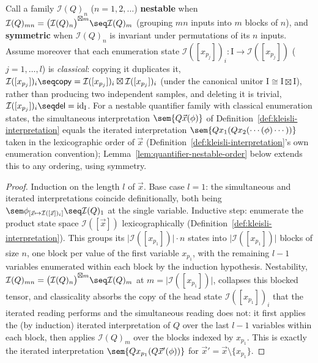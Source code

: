 \begin{lemma}
\label{lem:quantifier-nestable}
\leanok
Call a family $\mathcal I(Q)_n$ ($n = 1,2,\ldots$) \textbf{nestable}
when $\mathcal I(Q)_{mn} = \bigl(\mathcal I(Q)_n\bigr)^{\boxtimes m} \seq
\mathcal I(Q)_m$ (grouping $mn$ inputs into $m$ blocks of $n$), and
\textbf{symmetric} when $\mathcal I(Q)_n$ is invariant under
permutations of its $n$ inputs. Assume moreover that each enumeration
state $\mathcal I([x_{p_j}])_i \colon \mathrm I \to \mathcal
I([x_{p_j}])$ ($j = 1,\ldots,l$) is \emph{classical}: copying it
duplicates it, $\mathcal I([x_{p_j}])_i \seq \mathsf{copy} = \mathcal
I([x_{p_j}])_i \boxtimes \mathcal I([x_{p_j}])_i$ (under the canonical
unitor $\mathrm I \cong \mathrm I \boxtimes \mathrm I$), rather than
producing two independent samples, and deleting it is trivial,
$\mathcal I([x_{p_j}])_i \seq \mathsf{del} = \mathrm{id}_{\mathrm I}$.
For a nestable quantifier family with classical enumeration states,
the simultaneous interpretation
$\sem{Q\vec x(\phi)}$ of Definition~\ref{def:kleisli-interpretation}
equals the iterated interpretation
$\sem{Qx_1(Qx_2(\cdots(\phi)\cdots))}$ taken in the lexicographic
order of $\vec x$ (Definition~\ref{def:kleisli-interpretation}'s own
enumeration convention); Lemma~\ref{lem:quantifier-nestable-order}
below extends this to any ordering, using symmetry.
\end{lemma}

\begin{proof}
\leanok
Induction on the length $l$ of $\vec x$. Base case $l=1$: the
simultaneous and iterated interpretations coincide definitionally, both
being $\sem\phi_{[\vec x\mapsto \mathcal I([\vec x])_i]} \seq \mathcal
I(Q)_1$ at the single variable. Inductive step: enumerate the product
state space $\mathcal I([\vec x])$ lexicographically
(Definition~\ref{def:kleisli-interpretation}). This groups its
$\bigl|\mathcal I([x_{p_1}])\bigr|\cdot n$ states into
$\bigl|\mathcal I([x_{p_1}])\bigr|$ blocks of size $n$, one block per
value of the first variable $x_{p_1}$, with the remaining $l-1$
variables enumerated within each block by the induction hypothesis.
Nestability, $\mathcal I(Q)_{mn} = \bigl(\mathcal I(Q)_n\bigr)^{\boxtimes
m} \seq \mathcal I(Q)_m$ at $m = \bigl|\mathcal I([x_{p_1}])\bigr|$,
collapses this blocked tensor, and classicality absorbs the copy of
the head state $\mathcal I([x_{p_1}])_i$ that the iterated reading
performs and the simultaneous reading does not: it first applies the
(by induction) iterated interpretation of $Q$ over the last $l-1$
variables within each block, then applies $\mathcal I(Q)_m$ over the
blocks indexed by $x_{p_1}$. This is exactly the iterated
interpretation $\sem{Qx_{p_1}(Q\vec x'(\phi))}$ for $\vec x' = \vec x
\setminus\{x_{p_1}\}$.
\end{proof}

